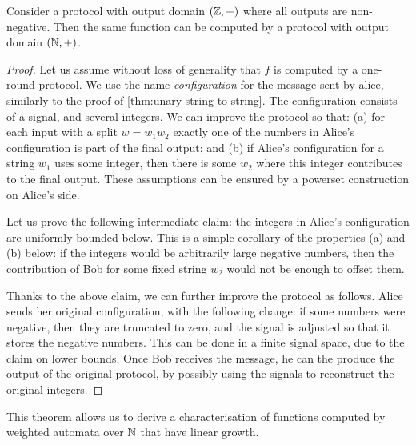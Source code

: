 \begin{theorem}
  \label{thm:string-to-number-protocols-nat}
  Consider a protocol with output domain $({\mathbb Z},+)$ where all outputs are non-negative. Then the same function can be computed by a protocol with output domain $({\mathbb N},+)$.
\end{theorem}
\begin{proof}
  Let us assume without loss of generality that $f$ is computed by a one-round
  protocol.  We use the name \emph{configuration} for the message sent by alice, similarly to the proof of \cref{thm:unary-string-to-string}. The configuration consists of a signal, and several integers. We can improve the protocol so that:  (a) for each input with a split $w = w_1 w_2$ exactly one of the numbers in Alice's configuration is part of the  final output; and (b) if Alice's configuration for a string $w_1$ uses some integer, then  there is some $w_2$ where this integer contributes to the final output.  These assumptions can be ensured by a powerset
  construction on Alice's side.

  Let us prove the following intermediate claim: the integers in  Alice's configuration are
  uniformly bounded below. This is a simple corollary of the properties (a) and (b) below: if the integers would be arbitrarily large negative numbers, then the contribution of Bob for some fixed string $w_2$ would not be enough to offset them. 


  Thanks to the above claim, we can further improve the protocol as follows. Alice sends her original configuration, with the following change: if some numbers were negative, then they are truncated to zero, and the signal is adjusted so that it stores the negative numbers. This can be done in a finite signal space, due to the claim on lower bounds. Once Bob receives the message, he can the produce the output of the original protocol, by possibly using the signals to reconstruct the original integers.
\end{proof}

This theorem allows us to derive a characterisation of functions 
computed by weighted automata over ${\mathbb N}$ that have linear growth.

